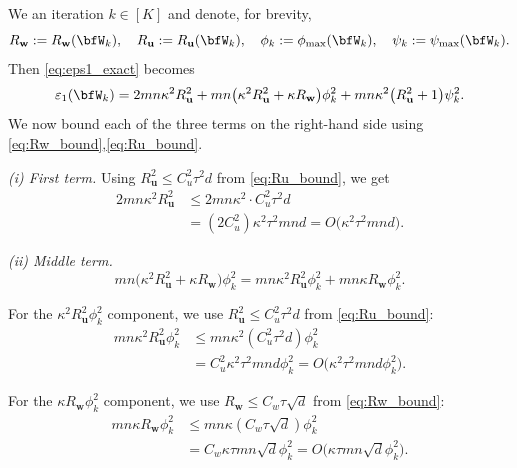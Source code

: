 \documentclass[10pt]{article} %
\theoremstyle{definition}
\theoremstyle{plain}
\def\bfu{{\mathbf{u}}}\def\bfv{{\mathbf{v}}}\def\bfw{{\mathbf{w}}}\def\bfx{{\mathbf{x}}}
\begin{document}
We an iteration $k\in[K]$ and denote, for brevity,
\[
    R_{\bfw} := R_{\bfw}(\bfW_k),
    \quad
    R_{\bfu} := R_{\bfu}(\bfW_k),
    \quad
    \phi_k := \phi_{\max}(\bfW_k),
    \quad
    \psi_k := \psi_{\max}(\bfW_k).
\]
Then \eqref{eq:eps1_exact} becomes
\begin{equation}
\label{eq:eps1Wk_expanded}
    \varepsilon_1(\bfW_k)
    =
    2mn\kappa^2R_{\bfu}^2
     + 
    mn\big(\kappa^2R_{\bfu}^2 + \kappa R_{\bfw}\big)\phi_k^2
     + 
    mn\kappa^2\big(R_{\bfu}^2+1\big)\psi_k^2.
\end{equation}
We now bound each of the three terms on the right-hand side using
\eqref{eq:Rw_bound},\eqref{eq:Ru_bound}.

\medskip\noindent
\emph{(i) First term.}
Using $R_{\bfu}^2 \le C_u^2\tau^2 d$ from \eqref{eq:Ru_bound}, we get
\begin{align}
    2mn\kappa^2R_{\bfu}^2
    &\le
    2mn\kappa^2\cdot C_u^2\tau^2 d
    \nonumber\\
    &=
    (2C_u^2) \kappa^2\tau^2 m n d
     = 
    O\big(\kappa^2\tau^2 m n d\big).
    \label{eq:eps1_term1}
\end{align}

\medskip\noindent
\emph{(ii) Middle term.}
\[
    mn\big(\kappa^2R_{\bfu}^2 + \kappa R_{\bfw}\big)\phi_k^2
    =
    mn\kappa^2R_{\bfu}^2\phi_k^2
     + 
    mn\kappa R_{\bfw}\phi_k^2.
\]

For the $\kappa^2R_{\bfu}^2\phi_k^2$ component, we use $R_{\bfu}^2\le C_u^2\tau^2 d$ from \eqref{eq:Ru_bound}:
\begin{align}
    mn\kappa^2R_{\bfu}^2\phi_k^2
    &\le
    mn\kappa^2 (C_u^2\tau^2 d) \phi_k^2
    \nonumber\\
    &=
    C_u^2 \kappa^2\tau^2 m n d \phi_k^2
     = 
    O\big(\kappa^2\tau^2 m n d \phi_k^2\big).
    \label{eq:eps1_term2a}
\end{align}

For the $\kappa R_{\bfw}\phi_k^2$ component, we use $R_{\bfw}\le C_w\tau \sqrt{d}$ from \eqref{eq:Rw_bound}:
\begin{align}
    mn\kappa R_{\bfw}\phi_k^2
    &\le
    mn\kappa (C_w\tau \sqrt{d}) \phi_k^2
    \nonumber\\
    &=
    C_w \kappa\tau m n \sqrt{d} \phi_k^2
     = 
    O\big(\kappa\tau m n \sqrt{d} \phi_k^2\big).
    \label{eq:eps1_term2b}
\end{align}
\end{document}
